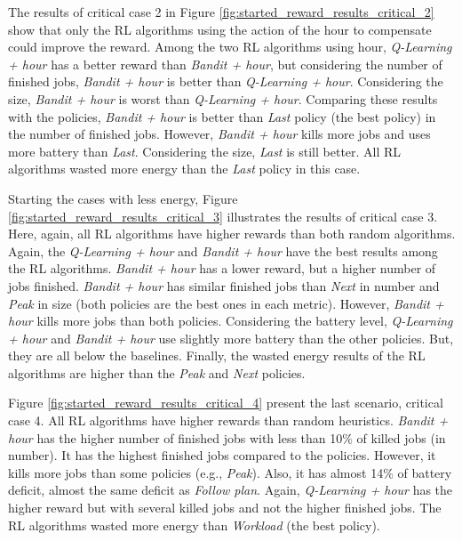 The results of critical case 2 in Figure \ref{fig:started_reward_results_critical_2} show that only the RL algorithms using the action of the hour to compensate could improve the reward. Among the two RL algorithms using hour, \emph{Q-Learning + hour} has a better reward than \emph{Bandit + hour}, but considering the number of finished jobs, \emph{Bandit + hour} is better than \emph{Q-Learning + hour}. Considering the size, \emph{Bandit + hour} is worst than \emph{Q-Learning + hour}. Comparing these results with the policies, \emph{Bandit + hour} is better than \emph{Last} policy (the best policy) in the number of finished jobs. However, \emph{Bandit + hour} kills more jobs and uses more battery than \emph{Last}. Considering the size, \emph{Last} is still better. All RL algorithms wasted more energy than the \emph{Last} policy in this case.

Starting the cases with less energy, Figure \ref{fig:started_reward_results_critical_3} illustrates the results of critical case 3. Here, again, all RL algorithms have higher rewards than both random algorithms. Again, the \emph{Q-Learning + hour} and \emph{Bandit + hour} have the best results among the RL algorithms. \emph{Bandit + hour} has a lower reward, but a higher number of jobs finished. \emph{Bandit + hour} has similar finished jobs than \emph{Next} in number and \emph{Peak} in size (both policies are the best ones in each metric). However, \emph{Bandit + hour} kills more jobs than both policies. Considering the battery level, \emph{Q-Learning + hour} and \emph{Bandit + hour} use slightly more battery than the other policies. But, they are all below the baselines. Finally, the wasted energy results of the RL algorithms are higher than the \emph{Peak} and \emph{Next} policies.

Figure \ref{fig:started_reward_results_critical_4} present the last scenario, critical case 4. All RL algorithms have higher rewards than random heuristics. \emph{Bandit + hour} has the higher number of finished jobs with less than 10\% of killed jobs (in number). It has the highest finished jobs compared to the policies. However, it kills more jobs than some policies (e.g., \emph{Peak}). Also, it has almost 14\% of battery deficit, almost the same deficit as \emph{Follow plan}. Again, \emph{Q-Learning + hour} has the higher reward but with several killed jobs and not the higher finished jobs. The RL algorithms wasted more energy than \emph{Workload} (the best policy).

